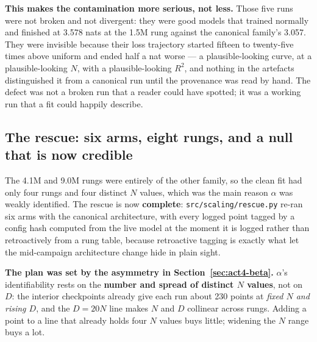 \documentclass[11pt,a4paper]{article}
\begin{document}
\textbf{This makes the contamination more serious, not less.} Those five runs
were not broken and not divergent: they were good models that trained normally
and finished at 3.578 nats at the 1.5M rung against the canonical family's
3.057. They were invisible because their loss trajectory started fifteen to
twenty-five times above uniform and ended half a nat worse --- a
plausible-looking curve, at a plausible-looking $N$, with a
plausible-looking $R^2$, and nothing in the artefacts distinguished it from a
canonical run until the provenance was read by hand. The defect was not a
broken run that a reader could have spotted; it was a working run that a fit
could happily describe. %

\subsection{The rescue: six arms, eight rungs, and a null that is now credible}
\label{sec:act4-rescue}

The 4.1M and 9.0M rungs were entirely of the other family, so the clean fit had
only four rungs and four distinct $N$ values, which was the main reason
$\alpha$ was weakly identified. The rescue is now \textbf{complete}:
\texttt{src/scaling/rescue.py} re-ran six arms with the canonical
architecture, with every logged point tagged by a config hash computed from the
live model at the moment it is logged rather than retroactively from a rung
table, because retroactive tagging is exactly what let the mid-campaign
architecture change hide in plain sight. %

\textbf{The plan was set by the asymmetry in
Section~\ref{sec:act4-beta}.} $\alpha$'s identifiability rests on the
\textbf{number and spread of distinct $N$ values}, not on $D$: the interior
checkpoints already give each run about 230 points at \emph{fixed $N$ and
rising $D$}, and the $D = 20N$ line makes $N$ and $D$ collinear across
rungs. Adding a point to a line that already holds four $N$ values buys
little; widening the $N$ range buys a lot.
\end{document}
